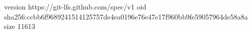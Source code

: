 version https://git-lfs.github.com/spec/v1
oid sha256:ccbb6f9689241514125757de4ea0196e76e47e17f960bb9fe59057964de58a8a
size 11613
